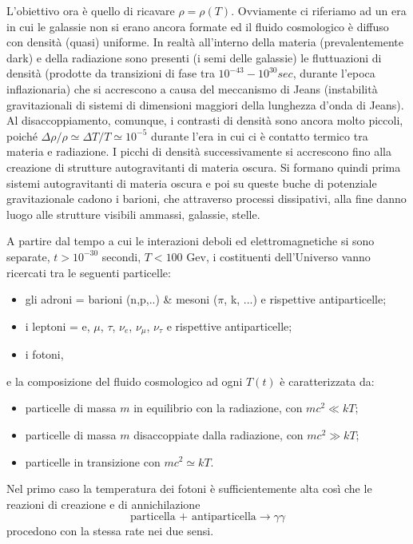 L'obiettivo ora è quello di ricavare $\rho= \rho(T)$.  Ovviamente ci riferiamo
ad un era in cui le galassie non si erano ancora formate ed il fluido
cosmologico è diffuso con densità (quasi) uniforme.  In realtà all'interno della
materia (prevalentemente dark) e della radiazione sono presenti (i semi delle
galassie) le fluttuazioni di densità (prodotte da transizioni di fase tra
$10^{-43} - 10^{30} sec$, durante l'epoca inflazionaria) che si accrescono a
causa del meccanismo di Jeans (instabilità gravitazionali di sistemi di
dimensioni maggiori della lunghezza d'onda di Jeans).  Al disaccoppiamento,
comunque, i contrasti di densità sono ancora molto piccoli, poiché $\Delta \rho
/ \rho \simeq \Delta T / T \simeq 10^{-5}$ durante l'era in cui ci è contatto
termico tra materia e radiazione. I picchi di densità successivamente si
accrescono fino alla creazione di strutture autogravitanti di materia oscura. Si
formano quindi prima sistemi autogravitanti di materia oscura e poi su queste
buche di potenziale gravitazionale cadono i barioni, che attraverso processi
dissipativi, alla fine danno luogo alle strutture visibili ammassi, galassie,
stelle.

A partire dal tempo a cui le interazioni deboli ed elettromagnetiche si sono separate,
$t > 10^{-30}$ secondi, $T < 100 $ Gev, i costituenti dell'Universo vanno ricercati
tra le seguenti particelle:
\begin{itemize}
\item gli adroni = barioni (n,p,..) \& mesoni ($\pi$, k, ...) e rispettive
  antiparticelle;
\item i leptoni = e, $\mu$, $\tau$, $\nu_e$, $\nu_{\mu}$, $\nu_{\tau}$ e
  rispettive antiparticelle;
\item i fotoni,
\end{itemize}
e la composizione del fluido cosmologico ad ogni $T(t)$ è caratterizzata da:
\begin{itemize}
\item particelle di massa $m$ in equilibrio con la radiazione, con $mc^2\ll kT$;
\item particelle di massa $m$ disaccoppiate dalla radiazione, con $mc^2\gg kT$;
\item particelle in transizione con $mc^2 \simeq kT$.
\end{itemize}
Nel primo caso la temperatura dei fotoni è sufficientemente alta così che le
reazioni di creazione e di annichilazione
\begin{equation}
  \text{particella + antiparticella} \to \gamma \gamma
\end{equation}
procedono con la stessa rate nei due sensi.

